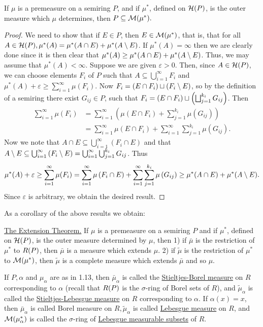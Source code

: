 \begin{theorem}
If $\mu$ is a premeasure on a semiring $P$, and if $\mu^*$, defined on ${\cal H}(P)$, is the outer measure which $\mu$ determines, then $P \subseteq {\cal M}(\mu^*) .$
\end{theorem}
\begin{proof}
We need to show that if $E \in P$, then $E \in {\cal M}(\mu^*)$, that is, that for all $A \in {\cal H}(P), \mu^*(A)=\mu^*(A \cap E)+\mu^*(A\setminus E)$. If $\mu^*(A)=\infty$ then we are clearly done since it is then clear that $\mu^*(A) \geq \mu^*(A \cap E)+\mu^*(A\setminus E)$. Thus, we may assume that $\mu^*(A)<\infty$. Suppose we are given $\varepsilon>0$. Then, since $A \in {\cal H}(P)$, we can choose elements $F_i$ of $P$ such that $A \subseteq \bigcup_{i=1}^\infty F_i$ and $\mu^*(A)+\varepsilon \geq \sum_{i=1}^\infty \mu(F_i)$. Now $F_i=(E \cap F_i) \sqcup(F_i\setminus E)$, so by the definition of a semiring there exist $G_{ij} \in P$, such that $F_i=(E \cap F_i) \sqcup\left(\bigsqcup_{j=1}^{k_i}G_{ij}\right)$. Then
\begin{align*}
\sum_{i=1}^\infty \mu(F_i)&=\sum_{i=1}^\infty(\mu(E \cap F_i)+\sum_{j=1}^{k_i} \mu(G_{i j})) \\
&=\sum_{i=1}^\infty \mu(E \cap F_i)+\sum_{i=1}^\infty \sum_{j=1}^{k_i} \mu(G_{i j}).
\end{align*}
Now we note that $A \cap E \subseteq \bigcup_{i=1}^\infty\left(F_i \cap E\right)$ and that $A\setminus E \subseteq \bigcup_{i=1}^\infty\left(F_i\setminus E\right)=\bigcup_{i=1}^\infty \bigcup_{j=1}^{k_i} G_{ij} $. Thus $$\mu^*(A)+\varepsilon \geq \sum_{i=1}^\infty \mu(F_i)=\sum_{i=1}^\infty \mu\left(F_i \cap E\right)+\sum_{i=1}^\infty \sum_{j=1}^{k_i} \mu\left(G_{i j}\right) \geq \mu^*(A \cap E)+\mu^*(A\setminus E).$$
Since $\varepsilon$ is arbitrary, we obtain the desired result.
\end{proof}

As a corollary of the above results we obtain:

\begin{theorem}
\underline{The Extension Theorem.} If $\mu$ is a premeasure on a semiring $P$ and if $\mu^*$, defined on ${\cal H}(P)$, is the outer measure determined by $\mu$, then 1) if $\bar{\mu}$ is the restriction of $\mu^*$ to $R(P)$, then $\bar{\mu}$ is a measure which extends $\mu$. 2) if $\tilde{\mu}$ is the restriction of $\mu^*$ to ${\cal M}(\mu^*)$, then $\tilde{\mu}$ is a complete measure which extends $\bar{\mu}$ and so $\mu$.
\end{theorem}

\begin{definition}
If $P, \alpha$ and $\mu_\alpha$ are as in 1.13, then $\bar{\mu}_\alpha$ is called the \underline{Stieltjes-Borel measure} on $R$ corresponding to $\alpha$ (recall that $R(P)$ is the $\sigma$-ring of Borel sets of $R$), and $\tilde{\mu}_\alpha$ is called the \underline{Stieltjes-Lebesgue measure} on ${R}$ corresponding to $\alpha$. If $\alpha(x)=x$, then $\bar{\mu}_\alpha$ is called Borel measure on $R, \tilde{\mu}_\alpha$ is called \underline{Lebesgue measure} on $R$, and ${\cal M}(\mu_\alpha^*)$ is called the $\sigma$-ring of \underline{Lebesgue measurable subsets} of $R$.
\end{definition}

